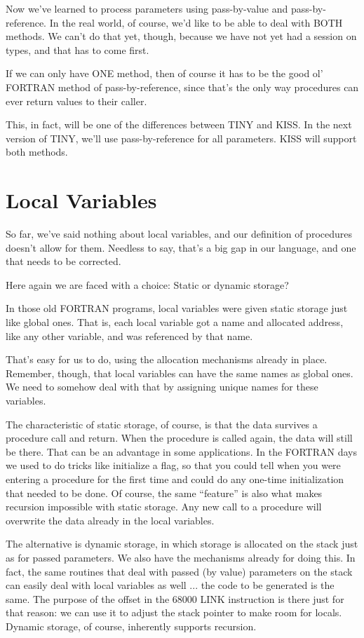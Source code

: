 Now we've learned to process parameters  using  pass-by-value and pass-by-reference. In the real world, of course, we'd like to be able  to  deal  with BOTH methods. We can't do that yet, though, because we have not yet had a session on types, and  that has to come first.

If  we can only have ONE method, then of course it has to be  the good ol' FORTRAN method of  pass-by-reference, since  that's the only way procedures can ever return values to their caller.

This, in fact, will be one of the differences  between  TINY  and KISS. In the next version of TINY, we'll  use pass-by-reference for all parameters. KISS will support both methods.

\section{Local Variables}

So  far, we've  said  nothing  about  local  variables, and  our definition of procedures doesn't allow  for  them. Needless to say, that's a big gap in our language, and one  that  needs to be corrected.

Here again we are faced with a choice: Static or dynamic storage?

In those  old FORTRAN programs, local variables were given static storage just like global ones. That is, each local  variable got a  name  and  allocated address, like any other variable, and was referenced by that name.

That's easy for us to do, using the allocation mechanisms already in place. Remember, though, that local variables can have  the same  names as global ones. We need to somehow deal with that by assigning unique names for these variables.

The characteristic of static storage, of course, is that the data survives  a procedure call and return. When  the  procedure  is called  again, the  data will still be there. That  can  be  an advantage in some applications. In the FORTRAN days we used to do tricks like initialize a flag, so that you could tell when you were entering a  procedure  for  the  first time and could do any one-time initialization that needed to be done.
Of  course, the  same  ``feature'' is also what  makes  recursion impossible with static storage. Any new call to a procedure will overwrite the data already in the local variables.

The alternative is dynamic storage, in which storage is allocated on the stack just as for passed parameters. We  also  have the mechanisms  already  for  doing this. In fact, the same routines that  deal with passed (by value) parameters  on  the  stack  can easily deal  with  local  variables  as  well  ... the code to be generated  is  the  same. The purpose of the offset in the 68000 LINK instruction is there just for that reason:  we can use it to adjust the stack  pointer  to  make  room  for  locals. Dynamic storage, of course, inherently supports recursion.


